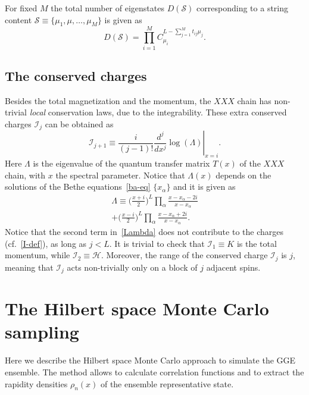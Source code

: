 \documentclass[twocolumn,superscriptaddress,prb,10pt]{revtex4-1}
\begin{document}
For fixed $M$ the total number of eigenstates $D({\mathcal S})$ corresponding 
to a string content ${\mathcal S}\equiv\{\mu_1,\mu,\dots,\mu_M\}$ is given as 
%
\begin{equation}
\label{str-prob}
D({\mathcal S})=\prod_{i=1}^MC_{\mu_i}^{L-\sum_{j=1}^M t_{ij}\mu_j}.
\end{equation}
%

\subsection{The conserved charges}

Besides the total magnetization and the momentum, the $XXX$ chain has non-trivial 
{\it local} conservation laws, due to the integrability. These extra conserved 
charges ${\mathcal I}_j$ can be obtained as 
%
\begin{equation}
\label{I-def}
\left.{\mathcal I}_{j+1}\equiv\frac{i}{(j-1)!}\frac{d^j}{dx^j}\log(\Lambda)
\right|_{x=i}.
\end{equation}
%
Here $\Lambda$ is the eigenvalue of the quantum transfer matrix $T(x)$ of the $XXX$ 
chain, with $x$ the spectral parameter. Notice that $\Lambda(x)$ depends on the 
solutions of the Bethe equations~\eqref{ba-eq}  $\{x_\alpha\}$  and it is given 
as 
%
\begin{multline}
\label{Lambda}
\Lambda\equiv\Big(\frac{x+i}{2}\Big)^L\prod\limits_\alpha\frac{x-x_\alpha-2i}{x-
x_\alpha}\\+\Big(\frac{x-i}{2}\Big)^L\prod\limits_\alpha\frac{x-x_\alpha+2i}
{x-x_\alpha}. 
\end{multline}
%
Notice that the second term in~\eqref{Lambda} does not contribute to the charges 
(cf.~\eqref{I-def}), as long as $j<L$. It is trivial to check that ${\mathcal I}_1
\equiv K$ is the total momentum, while ${\mathcal I}_2\equiv {\mathcal H}$. Moreover, 
the range of the conserved charge ${\mathcal I}_j$ is $j$, meaning that ${\mathcal I}_j$ 
acts non-trivially only on a block of $j$ adjacent spins. 


\section{The Hilbert space Monte Carlo sampling}

Here we describe the Hilbert space Monte Carlo approach to simulate the GGE 
ensemble. The method allows to calculate correlation functions and to extract 
the rapidity densities $\rho_n(x)$ of the ensemble representative state. 
\end{document}
